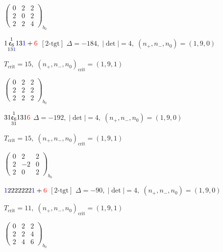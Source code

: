 \documentclass[10pt]{article}
\begin{document}
\hspace{2em}$\left(\begin{smallmatrix}0 & 2 & 2 \\ 2 & 0 & 2 \\ 2 & 2 & 4\end{smallmatrix}\right)_{\!b_0}$

\smallskip

$1\overset{1}{\underset{13\textcolor{blue}{1}}{\mathfrak{e}_6}}13\textcolor{blue}{1}+\textcolor{red}{6}$ $\scriptstyle [2\text{-tgt}]$ \quad $\Delta=-184,\; |\det|=4,\; (n_+,n_-,n_0)=(1,9,0)$

\hspace{1em}$T_{\text{crit}}=15,\; (n_+,n_-,n_0)_{\text{crit}}=(1,9,1)$

\hspace{2em}$\left(\begin{smallmatrix}0 & 2 & 2 \\ 2 & 2 & 2 \\ 2 & 2 & 2\end{smallmatrix}\right)_{\!b_0}$

\smallskip

$31\overset{1}{\underset{31}{\mathfrak{e}_6}}131\textcolor{red}{6}$ \quad $\Delta=-192,\; |\det|=4,\; (n_+,n_-,n_0)=(1,9,0)$

\hspace{1em}$T_{\text{crit}}=15,\; (n_+,n_-,n_0)_{\text{crit}}=(1,9,1)$

\hspace{2em}$\left(\begin{smallmatrix}0 & 2 & 2 \\ 2 & -2 & 0 \\ 2 & 0 & 2\end{smallmatrix}\right)_{\!b_0}$

\smallskip

$\textcolor{blue}{1}2222222\textcolor{blue}{1}+\textcolor{red}{6}$ $\scriptstyle [2\text{-tgt}]$ \quad $\Delta=-90,\; |\det|=4,\; (n_+,n_-,n_0)=(1,9,0)$

\hspace{1em}$T_{\text{crit}}=11,\; (n_+,n_-,n_0)_{\text{crit}}=(1,9,1)$

\hspace{2em}$\left(\begin{smallmatrix}0 & 2 & 2 \\ 2 & 2 & 4 \\ 2 & 4 & 6\end{smallmatrix}\right)_{\!b_0}$
\end{document}
